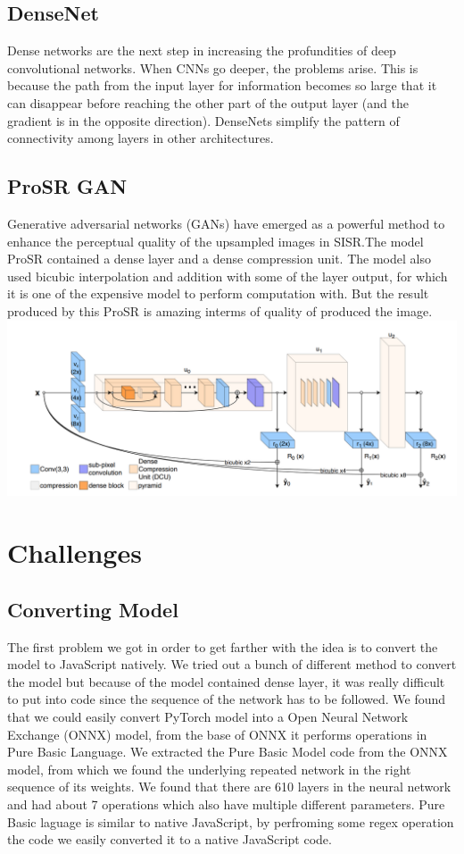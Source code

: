 \documentclass[a4paper,12pt]{article}
\begin{document}
\subsection{DenseNet}
Dense networks are the next step in increasing the profundities of deep convolutional networks. When CNNs go deeper, the problems arise. This is because the path from the input layer for information becomes so large that it can disappear before reaching the other part of the output layer (and the gradient is in the opposite direction). DenseNets simplify the pattern of connectivity among layers in other architectures. 

\subsection{ProSR GAN}
Generative adversarial networks (GANs) have emerged as a powerful method to enhance the perceptual quality of the upsampled images in SISR.The model ProSR contained a dense layer and a dense compression unit. The model also used bicubic interpolation and addition with some of the layer output, for which it is one of the expensive model to perform computation with. But the result produced by this ProSR is amazing interms of quality of produced the image.
\cite{ref1}
\\
\includegraphics[width=\linewidth]{prosr.png}

\section{Challenges}

\subsection{Converting Model}
The first problem we got in order to get farther with the idea is to convert the model to JavaScript natively. We tried out a bunch of different method to convert the model but because of the model contained dense layer, it was really difficult to put into code since the sequence of the network has to be followed. We found that we could easily convert PyTorch model into a  Open Neural Network Exchange (ONNX) model, from the base of ONNX it performs operations in Pure Basic Language. We extracted the Pure Basic Model code from the ONNX model, from which we found the underlying repeated network in the right sequence of its weights. We found that there are 610 layers in the neural network and had about 7 operations which also have multiple different parameters. Pure Basic laguage is similar to native JavaScript, by perfroming some regex operation the code we easily converted it to a native JavaScript code. 
\end{document}
